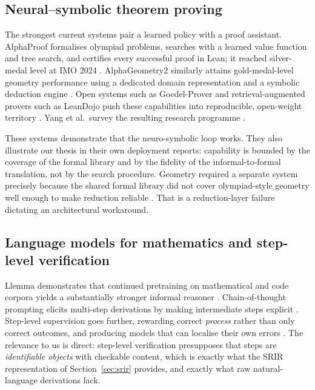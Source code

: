 \documentclass[11pt,a4paper]{article}
\theoremstyle{definition}
\theoremstyle{plain}
\theoremstyle{remark}
\begin{document}
\subsection{Neural--symbolic theorem proving}

The strongest current systems pair a learned policy with a proof assistant.
AlphaProof formalises olympiad problems, searches with a learned value function
and tree search, and certifies every successful proof in Lean; it reached
silver-medal level at IMO 2024 \cite{hubert2026olympiad}. AlphaGeometry2
similarly attains gold-medal-level geometry performance using a dedicated
domain representation and a symbolic deduction engine \cite{chervonyi2025gold}.
Open systems such as Goedel-Prover and retrieval-augmented provers such as
LeanDojo push these capabilities into reproducible, open-weight territory
\cite{lin2025goedel,yang2023leandojo}. Yang et al.\ survey the resulting
research programme \cite{yang2024formal}.

These systems demonstrate that the neuro-symbolic loop works. They also
illustrate our thesis in their own deployment reports: capability is bounded by
the coverage of the formal library and by the fidelity of the informal-to-formal
translation, not by the search procedure. Geometry required a separate system
precisely because the shared formal library did not cover olympiad-style
geometry well enough to make reduction reliable
\cite{chervonyi2025gold}. That is a reduction-layer failure dictating an
architectural workaround.

\subsection{Language models for mathematics and step-level verification}

Llemma demonstrates that continued pretraining on mathematical and code corpora
yields a substantially stronger informal reasoner
\cite{azerbayev2024llemma}. Chain-of-thought prompting elicits multi-step
derivations by making intermediate steps explicit
\cite{wei2022chain}. Step-level supervision goes further, rewarding correct
\emph{process} rather than only correct outcomes, and producing models that can
localise their own errors
\cite{lightman2023verify}. The relevance to us is direct: step-level
verification presupposes that steps are \emph{identifiable objects} with
checkable content, which is exactly what the SRIR representation of
Section~\ref{sec:srir} provides, and exactly what raw natural-language
derivations lack.
\end{document}
